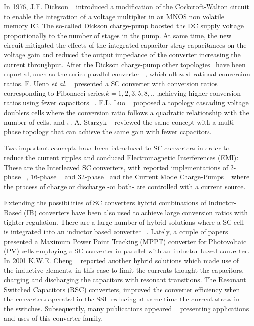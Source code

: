 In 1976, J.F. Dickson ~\cite{76Dickson} introduced a modification of the Cockcroft-Walton circuit to enable the
integration of a voltage multiplier in an MNOS non volatile memory IC. The so-called Dickson charge-pump boosted
the DC supply voltage proportionally to the number of stages in the pump. At same time, the new circuit mitigated the effects
of the integrated capacitor stray capacitances on the voltage gain and reduced the output impedance
of the converter increasing the current throughput. After the Dickson charge-pump other topologies~\cite{09Seeman} have been reported, such as the series-parallel converter ~\cite{94Ngo,94Cheong}, which allowed rational conversion ratios. F. Ueno \textit{et al.} ~\cite{91Ueno} presented a SC converter with conversion ratios corresponding to Fibonacci series,$k=1,2,3,5,8,..$ ,achieving higher conversion ratios using fewer capacitors ~\cite{95Makowski,09Allasameh}.  F.L. Luo  ~\cite{02Luo,10Chang}
proposed a topology cascading voltage doublers cells where the conversion ratio follows a quadratic relationship with the number
 of cells, and J. A. Starzyk ~\cite{01Starzyk} reviewed the same concept with a multi-phase topology that can achieve the same gain with fewer capacitors.

Two important concepts have been introduced to SC converters in order to reduce the current ripples and conduced Electromagnetic Interferences (EMI): These are the Interleaved SC converters, with reported implementations of 2-phase ~\cite{10Chang,07Chang,99Chung}, 16-phase ~\cite{09Breussegem} and 32-phase~\cite{10Le} and the Current Mode Charge-Pumps ~\cite{96Zhu,09Das} where the process of charge or discharge -or both- are controlled with a current source.

Extending the possibilities of SC converters hybrid combinations of Inductor-Based (IB) converters have been also used to achieve large
conversion ratios with tighter regulation. There are a large number of hybrid solutions where a SC cell is integrated into an inductor
based converter ~\cite{05Axelrod,08Axelrod, 11Mayo,11Miranda,12Kline}. Lately, a couple of papers ~\cite{12Zhigang,11Dazhong} presented a
Maximum Power Point Tracking (MPPT) converter for Photovoltaic (PV) cells employing a SC converter in parallel with an inductor based converter.
In 2001 K.W.E. Cheng ~\cite{01Cheng} reported another hybrid solutions which made use of the inductive elements, in this case to limit the
currents thought the capacitors, charging and discharging the capacitors with resonant transitions. The Resonant Switched Capacitors (RSC) converters,
improved the converter efficiency when the converters operated in the SSL reducing at same time the current stress in the switches. Subsequently, many publications appeared ~\cite{05Lee,10Cao,11Gebben,07Shoyama} presenting applications and uses of this converter family.



